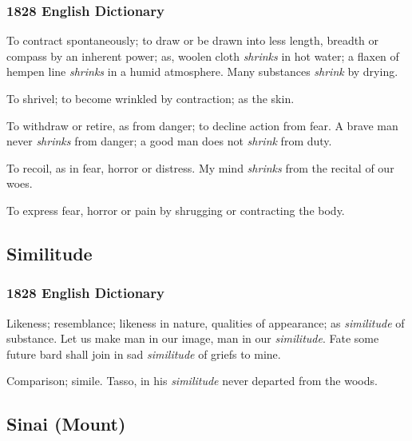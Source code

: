 		\subsubsection{1828 English Dictionary}
		
			\begin{compactitem}
				\item[1] To contract spontaneously; to draw or be drawn into less length, breadth or compass by an inherent power; as, woolen cloth \textit{shrinks} in hot water; a flaxen of hempen line \textit{shrinks} in a humid atmosphere. Many substances \textit{shrink} by drying.
				\item[2] To shrivel; to become wrinkled by contraction; as the skin.
				\item[3] To withdraw or retire, as from danger; to decline action from fear. A brave man never \textit{shrinks} from danger; a good man does not \textit{shrink} from duty.
				\item[4] To recoil, as in fear, horror or distress. My mind \textit{shrinks} from the recital of our woes.
				\item[5] To express fear, horror or pain by shrugging or contracting the body.
			\end{compactitem}
			
	\subsection{Similitude} %
		\label{SIMILITUDE}
		
		\subsubsection{1828 English Dictionary}
		
			\begin{compactitem}
				\item[1] Likeness; resemblance; likeness in nature, qualities of appearance; as \textit{similitude} of substance. Let us make man in our image, man in our \textit{similitude}. Fate some future bard shall join in sad \textit{similitude} of griefs to mine.
				\item[2] Comparison; simile. Tasso, in his \textit{similitude} never departed from the woods.
			\end{compactitem}

	\subsection{Sinai (Mount)} %
		\label{SINAI}
		
